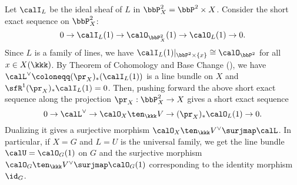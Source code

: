 \begin{example}
        Let \(\calI_L\) be the ideal sheaf of \(L\) in \(\bbP_X^2 = \bbP^2 \times X\).
        Consider the short exact sequence on \(\bbP_X^2\):
        \[ 0 \to \calI_L(1) \to \calO_{\bbP_{X}^2}(1) \to \calO_{L}(1) \to 0. \]
        Since \(L\) is a family of lines, we have \(\calI_L(1)|_{\bbP^2 \times \{x\}} \cong \calO_{\bbP^2}\) for all \(x \in X(\kkk)\).
        By Theorem of Cohomology and Base Change (), we have \(\calL^\vee \coloneqq (\pr_X)_*(\calI_L(1))\) is a line bundle on \(X\) and \(\sfR^1(\pr_X)_*\calI_L(1) = 0\).
        Then, pushing forward the above short exact sequence along the projection \(\pr_X: \bbP_X^2 \to X\) gives a short exact sequence
        \[ 0 \to \calL^{\vee} \to \calO_X \ten_{\kkk} V \to (\pr_X)_*\calO_L(1) \to 0. \]
        Dualizing it gives a surjective morphism \(\calO_X \ten_{\kkk} V^{\vee} \surjmap \calL\).
        In particular, if \(X = G\) and \(L = U\) is the universal family, we get the line bundle \(\calU = \calO_G(1)\) on \(G\) and the surjective morphism \(\calO_G \ten_{\kkk} V^{\vee} \surjmap \calO_G(1)\) corresponding to the identity morphism \(\id_G\).


\end{example}
